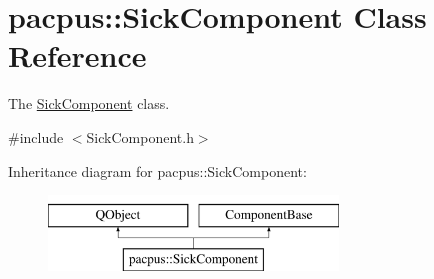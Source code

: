 \hypertarget{classpacpus_1_1SickComponent}{\section{pacpus\-:\-:Sick\-Component Class Reference}
\label{classpacpus_1_1SickComponent}
}


The \hyperlink{classpacpus_1_1SickComponent}{Sick\-Component} class.  




{\ttfamily \#include $<$Sick\-Component.\-h$>$}

Inheritance diagram for pacpus\-:\-:Sick\-Component\-:\begin{figure}[H]
\begin{center}
\leavevmode
\includegraphics[height=2.000000cm]{classpacpus_1_1SickComponent}
\end{center}
\end{figure}
